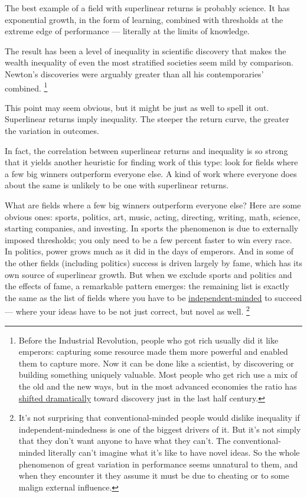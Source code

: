 \documentclass[12pt]{book}
\begin{document}
The best example of a field with superlinear returns is probably
science. It has exponential growth, in the form of learning, combined
with thresholds at the extreme edge of performance --- literally at the
limits of knowledge.

The result has been a level of inequality in scientific discovery that
makes the wealth inequality of even the most stratified societies seem
mild by comparison. Newton's discoveries were arguably greater than all
his contemporaries' combined. \footnote{Before the Industrial Revolution, people who got rich usually
did it like emperors: capturing some resource made them more powerful
and enabled them to capture more. Now it can be done like a scientist,
by discovering or building something uniquely valuable. Most people who
get rich use a mix of the old and the new ways, but in the most advanced
economies the ratio has \href{richnow.html}{shifted dramatically} toward
discovery just in the last half century.}

This point may seem obvious, but it might be just as well to spell it
out. Superlinear returns imply inequality. The steeper the return curve,
the greater the variation in outcomes.

In fact, the correlation between superlinear returns and inequality is
so strong that it yields another heuristic for finding work of this
type: look for fields where a few big winners outperform everyone else.
A kind of work where everyone does about the same is unlikely to be one
with superlinear returns.

What are fields where a few big winners outperform everyone else? Here
are some obvious ones: sports, politics, art, music, acting, directing,
writing, math, science, starting companies, and investing. In sports the
phenomenon is due to externally imposed thresholds; you only need to be
a few percent faster to win every race. In politics, power grows much as
it did in the days of emperors. And in some of the other fields
(including politics) success is driven largely by fame, which has its
own source of superlinear growth. But when we exclude sports and
politics and the effects of fame, a remarkable pattern emerges: the
remaining list is exactly the same as the list of fields where you have
to be \href{think.html}{independent-minded} to succeed --- where your
ideas have to be not just correct, but novel as well.
\footnote{It's not surprising that conventional-minded people would
dislike inequality if independent-mindedness is one of the biggest
drivers of it. But it's not simply that they don't want anyone to have
what they can't. The conventional-minded literally can't imagine what
it's like to have novel ideas. So the whole phenomenon of great
variation in performance seems unnatural to them, and when they
encounter it they assume it must be due to cheating or to some malign
external influence.}
\end{document}
